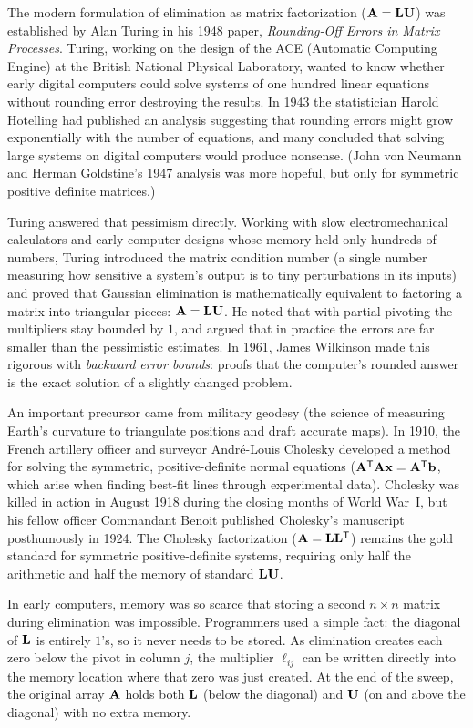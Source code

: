 \begin{historybox}
The modern formulation of elimination as matrix factorization ($\mathbf{A} = \mathbf{L}\mathbf{U}$) was established
by Alan Turing in his 1948 paper, \emph{Rounding-Off Errors in Matrix Processes}. Turing, working on the design
of the ACE (Automatic Computing Engine) at the British National Physical Laboratory, wanted to know whether
early digital computers could solve systems of one hundred linear equations without rounding error destroying
the results. In 1943 the statistician Harold Hotelling had published an analysis suggesting that rounding
errors might grow exponentially with the number of equations, and many concluded that solving large systems
on digital computers would produce nonsense. (John von Neumann and Herman Goldstine's 1947 analysis was more
hopeful, but only for symmetric positive definite matrices.)

Turing answered that pessimism directly. Working with slow electromechanical calculators and
early computer designs whose memory held only hundreds of numbers, Turing introduced the matrix condition number
(a single number measuring how sensitive a system's output is to tiny perturbations in its inputs) and proved
that Gaussian elimination is mathematically equivalent to factoring a matrix into triangular pieces:
$\mathbf{A} = \mathbf{L}\mathbf{U}$. He noted that with partial pivoting the multipliers stay bounded by $1$, and argued
that in practice the errors are far smaller than the pessimistic estimates. In 1961, James Wilkinson made this
rigorous with \emph{backward error bounds}: proofs that the computer's rounded answer is the exact solution
of a slightly changed problem.

An important precursor came from military geodesy (the science of measuring Earth's curvature to triangulate
positions and draft accurate maps). In 1910, the French artillery officer and surveyor André-Louis Cholesky
developed a method for solving the symmetric, positive-definite normal equations ($\mathbf{A}^{\mathsf{T}}\mathbf{A}\mathbf{x}=\mathbf{A}^{\mathsf{T}}\mathbf{b}$,
which arise when finding best-fit lines through experimental data). Cholesky was killed in action in August 1918
during the closing months of World War~I, but his fellow officer Commandant Benoit published Cholesky's manuscript
posthumously in 1924. The Cholesky factorization ($\mathbf{A} = \mathbf{L}\mathbf{L}^{\mathsf{T}}$) remains the gold standard for
symmetric positive-definite systems, requiring only half the arithmetic and half the memory of standard $\mathbf{L}\mathbf{U}$.

In early computers, memory was so scarce that storing a second $n\times n$ matrix during elimination was
impossible. Programmers used a simple fact: the diagonal of $\mathbf{L}$ is entirely $1$'s, so
it never needs to be stored. As elimination creates each zero below the pivot in column $j$, the multiplier
$\ell_{ij}$ can be written directly into the memory location where that zero was just created. At the end of the
sweep, the original array $\mathbf{A}$ holds both $\mathbf{L}$ (below the diagonal) and $\mathbf{U}$ (on and above the diagonal)
with no extra memory.


\end{historybox}
